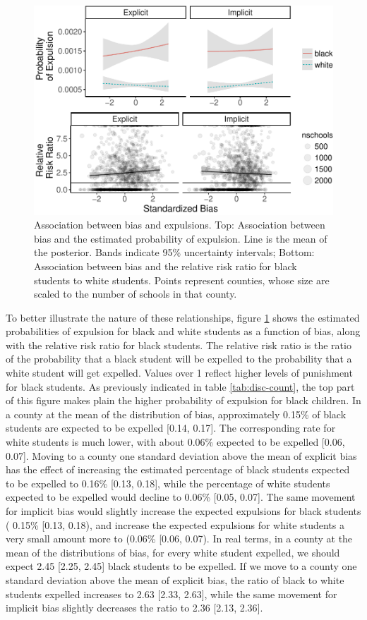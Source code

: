 \documentclass[english,floatsintext,man]{apa6}
\theoremstyle{definition}
\theoremstyle{definition}
\theoremstyle{remark}
\begin{document}
\begin{figure}
\centering
\includegraphics{draft_files/figure-latex/detail-fig-exp-1.pdf}
\caption{\label{fig:detail-fig-exp}Association between bias and expulsions.
Top: Association between bias and the estimated probability of
expulsion. Line is the mean of the posterior. Bands indicate 95\%
uncertainty intervals; Bottom: Association between bias and the relative
risk ratio for black students to white students. Points represent
counties, whose size are scaled to the number of schools in that
county.}
\end{figure}

To better illustrate the nature of these relationships, figure
\ref{fig:detail-fig-exp} shows the estimated probabilities of expulsion
for black and white students as a function of bias, along with the
relative risk ratio for black students. The relative risk ratio is the
ratio of the probability that a black student will be expelled to the
probability that a white student will get expelled. Values over 1
reflect higher levels of punishment for black students. As previously
indicated in table \ref{tab:disc-count}, the top part of this figure
makes plain the higher probability of expulsion for black children. In a
county at the mean of the distribution of bias, approximately 0.15\% of
black students are expected to be expelled {[}0.14, 0.17{]}. The
corresponding rate for white students is much lower, with about 0.06\%
expected to be expelled {[}0.06, 0.07{]}. Moving to a county one
standard deviation above the mean of explicit bias has the effect of
increasing the estimated percentage of black students expected to be
expelled to 0.16\% {[}0.13, 0.18{]}, while the percentage of white
students expected to be expelled would decline to 0.06\% {[}0.05,
0.07{]}. The same movement for implicit bias would slightly increase the
expected expulsions for black students ( 0.15\% {[}0.13, 0.18), and
increase the expected expulsions for white students a very small amount
more to (0.06\% {[}0.06, 0.07). In real terms, in a county at the mean
of the distributions of bias, for every white student expelled, we
should expect 2.45 {[}2.25, 2.45{]} black students to be expelled. If we
move to a county one standard deviation above the mean of explicit bias,
the ratio of black to white students expelled increases to 2.63 {[}2.33,
2.63{]}, while the same movement for implicit bias slightly decreases
the ratio to 2.36 {[}2.13, 2.36{]}.
\end{document}
